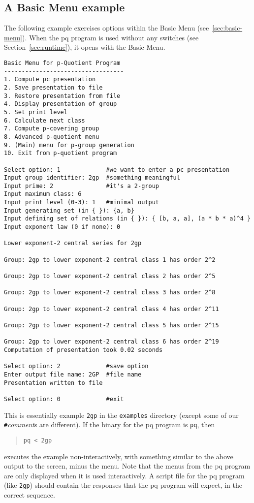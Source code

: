 \documentclass[12pt]{article}
\begin{document}
\subsection{A Basic Menu example}
The following example exercises options within the Basic Menu
(see~\ref{sec:basic-menu}). When the pq program is used without any switches
(see Section~\ref{sec:runtime}), it opens with the Basic Menu.
\begin{verbatim}
Basic Menu for p-Quotient Program
----------------------------------
1. Compute pc presentation
2. Save presentation to file
3. Restore presentation from file
4. Display presentation of group
5. Set print level
6. Calculate next class
7. Compute p-covering group
8. Advanced p-quotient menu
9. (Main) menu for p-group generation
10. Exit from p-quotient program

Select option: 1             #we want to enter a pc presentation
Input group identifier: 2gp  #something meaningful
Input prime: 2               #it's a 2-group
Input maximum class: 6
Input print level (0-3): 1   #minimal output
Input generating set (in { }): {a, b}
Input defining set of relations (in { }): { [b, a, a], (a * b * a)^4 }
Input exponent law (0 if none): 0

Lower exponent-2 central series for 2gp

Group: 2gp to lower exponent-2 central class 1 has order 2^2

Group: 2gp to lower exponent-2 central class 2 has order 2^5

Group: 2gp to lower exponent-2 central class 3 has order 2^8

Group: 2gp to lower exponent-2 central class 4 has order 2^11

Group: 2gp to lower exponent-2 central class 5 has order 2^15

Group: 2gp to lower exponent-2 central class 6 has order 2^19
Computation of presentation took 0.02 seconds

Select option: 2             #save option
Enter output file name: 2GP  #file name
Presentation written to file

Select option: 0             #exit
\end{verbatim}

This is essentially example \texttt{2gp} in the \texttt{examples} directory
(except some of our \texttt{\#}\textit{comment}s are different).
If the binary for the pq program is \texttt{pq}, then
\begin{quote}
 \verb|pq < 2gp|
\end{quote}
executes the example non-interactively, with something similar to the above
output to the screen, minus the menu. Note that
the menus from the pq program are only displayed when it is used interactively.
A script file for the pq program (like \texttt{2gp}) should contain the
responses that the pq program will expect, in the correct sequence.
\end{document}

